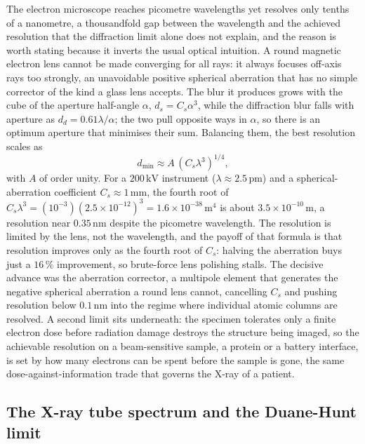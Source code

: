 The electron microscope reaches picometre wavelengths yet resolves only
tenths of a nanometre, a thousandfold gap between the wavelength and the
achieved resolution that the diffraction limit alone does not explain, and
the reason is worth stating because it inverts the usual optical intuition.
A round magnetic electron lens cannot be made converging for all rays: it
always focuses off-axis rays too strongly, an unavoidable positive spherical
aberration that has no simple corrector of the kind a glass lens accepts.
The blur it produces grows with the cube of the aperture half-angle $\alpha$,
$d_s = C_s\alpha^{3}$, while the diffraction blur falls with aperture as
$d_d = 0.61\lambda/\alpha$; the two pull opposite ways in $\alpha$, so there
is an optimum aperture that minimises their sum. Balancing them, the best
resolution scales as
\[
d_{\min} \approx A\,(C_s\lambda^{3})^{1/4},
\]
with $A$ of order unity. For a $200\,\si{\kilo\volt}$ instrument
($\lambda \approx 2.5\,\si{\pico\meter}$) and a spherical-aberration
coefficient $C_s \approx 1\,\si{\milli\meter}$, the fourth root of $C_s
\lambda^{3} = (10^{-3})(2.5\times 10^{-12})^{3} = 1.6\times 10^{-38}\,
\text{m}^{4}$ is about $3.5\times 10^{-10}\,\si{\meter}$, a resolution
near $0.35\,\si{\nano\meter}$ despite the picometre wavelength. The resolution
is limited by the lens, not the wavelength, and the payoff of that formula is
that resolution improves only as the fourth root of $C_s$: halving the
aberration buys just a $16\,\%$ improvement, so brute-force lens polishing
stalls. The decisive advance was the aberration corrector, a multipole
element that generates the negative spherical aberration a round lens cannot,
cancelling $C_s$ and pushing resolution below $0.1\,\si{\nano\meter}$ into the
regime where individual atomic columns are resolved. A second limit sits
underneath: the specimen tolerates only a finite electron dose before
radiation damage destroys the structure being imaged, so the achievable
resolution on a beam-sensitive sample, a protein or a battery interface, is
set by how many electrons can be spent before the sample is gone, the same
dose-against-information trade that governs the X-ray of a patient.

\subsection{The X-ray tube spectrum and the Duane-Hunt limit}

